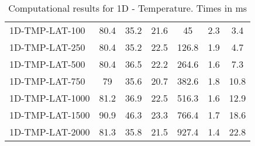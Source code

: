 \documentclass{article}
\begin{document}
\begin{table}[h]
\begin{center}
\begin{tabular}{|l||c|c|c|c|c|c|}
            1D-TMP-LAT-100                      & 80.4 & 35.2       & 21.6       & 45          & 2.3       & 3.4        \\
            1D-TMP-LAT-250                      & 80.4 & 35.2       & 22.5       & 126.8       & 1.9       & 4.7        \\
            1D-TMP-LAT-500                      & 80.4 & 36.5       & 22.2       & 264.6       & 1.6       & 7.3        \\
            1D-TMP-LAT-750                      & 79   & 35.6       & 20.7       & 382.6       & 1.8       & 10.8       \\
            1D-TMP-LAT-1000                     & 81.2 & 36.9       & 22.5       & 516.3       & 1.6       & 12.9       \\
            1D-TMP-LAT-1500                     & 90.9 & 46.3       & 23.3       & 766.4       & 1.7       & 18.6       \\
            1D-TMP-LAT-2000                     & 81.3 & 35.8       & 21.5       & 927.4       & 1.4       & 22.8       \\
            \hline
        \end{tabular}
    \end{center}
        \caption{Computational results for 1D - Temperature. Times in ms}
        \label{tab:1d_real_life}
    \end{table}
\restoregeometry
\end{document}
